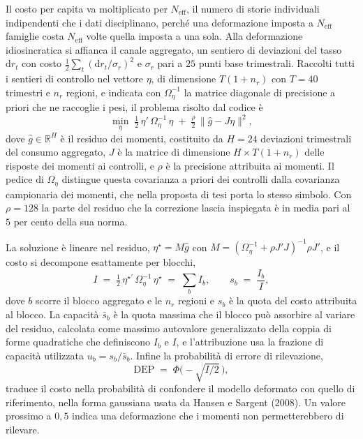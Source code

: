 \documentclass[11pt,a4paper]{article}
\newcommand{\R}{\mathbb{R}}
\newcommand{\DEP}{\mathrm{DEP}}
\newcommand{\Neff}{N_{\mathrm{eff}}}
\newcommand{\dd}{\mathrm{d}}
\begin{document}
Il costo per capita va moltiplicato per $\Neff$, il numero di storie individuali indipendenti che i dati disciplinano, perché una deformazione imposta a $\Neff$ famiglie costa $\Neff$ volte quella imposta a una sola. Alla deformazione idiosincratica si affianca il canale aggregato, un sentiero di deviazioni del tasso $\dd r_t$ con costo $\tfrac12\sum_t(\dd r_t/\sigma_r)^2$ e $\sigma_r$ pari a $25$ punti base trimestrali. Raccolti tutti i sentieri di controllo nel vettore $\eta$, di dimensione $T(1+n_r)$ con $T=40$ trimestri e $n_r$ regioni, e indicata con $\Omega_\eta^{-1}$ la matrice diagonale di precisione a priori che ne raccoglie i pesi, il problema risolto dal codice è
\begin{equation}\label{eq:problema}
\min_{\eta}\;\tfrac12\,\eta'\,\Omega_\eta^{-1}\,\eta\;+\;\tfrac{\rho}{2}\,\big\|\hat g-J\eta\big\|^2,
\end{equation}
dove $\hat g\in\R^{H}$ è il residuo dei momenti, costituito da $H=24$ deviazioni trimestrali del consumo aggregato, $J$ è la matrice di dimensione $H\times T(1+n_r)$ delle risposte dei momenti ai controlli, e $\rho$ è la precisione attribuita ai momenti. Il pedice di $\Omega_\eta$ distingue questa covarianza a priori dei controlli dalla covarianza campionaria dei momenti, che nella proposta di tesi porta lo stesso simbolo. Con $\rho=128$ la parte del residuo che la correzione lascia inspiegata è in media pari al $5$ per cento della sua norma.

La soluzione è lineare nel residuo, $\eta^\star=M\hat g$ con $M=(\Omega_\eta^{-1}+\rho J'J)^{-1}\rho J'$, e il costo si decompone esattamente per blocchi,
\begin{equation}\label{eq:decomposizione}
I\;=\;\tfrac12\,\eta^{\star\prime}\,\Omega_\eta^{-1}\,\eta^\star\;=\;\sum_{b}I_b,\qquad s_b\;=\;\frac{I_b}{I},
\end{equation}
dove $b$ scorre il blocco aggregato e le $n_r$ regioni e $s_b$ è la quota del costo attribuita al blocco. La capacità $\bar s_b$ è la quota massima che il blocco può assorbire al variare del residuo, calcolata come massimo autovalore generalizzato della coppia di forme quadratiche che definiscono $I_b$ e $I$, e l'attribuzione usa la frazione di capacità utilizzata $u_b=s_b/\bar s_b$. Infine la probabilità di errore di rilevazione,
\begin{equation}\label{eq:dep}
\DEP\;=\;\Phi\big(-\sqrt{I/2}\,\big),
\end{equation}
traduce il costo nella probabilità di confondere il modello deformato con quello di riferimento, nella forma gaussiana usata da Hansen e Sargent (2008). Un valore prossimo a $0{,}5$ indica una deformazione che i momenti non permetterebbero di rilevare.
\end{document}
